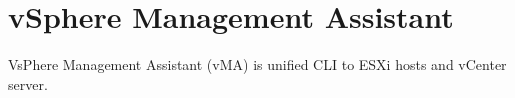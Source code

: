 \section{vSphere Management Assistant}

VsPhere Management Assistant (vMA) is unified CLI to ESXi hosts and vCenter
server.
